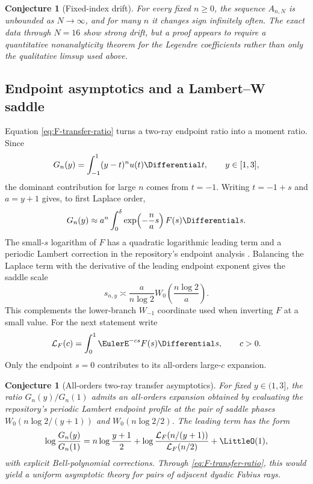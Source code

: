 \documentclass[11pt,oneside]{article}
\newtheorem{conjecture}[theorem]{Conjecture}
\theoremstyle{definition}
\theoremstyle{remark}
\begin{document}
\begin{conjecture}[Fixed-index drift]
\label{conj:fixed-index-drift}
For every fixed $n\ge0$, the sequence $A_{n,N}$ is unbounded as
$N\to\infty$, and for many $n$ it changes sign infinitely often.  The exact
data through $N=16$ show strong drift, but a proof appears to require a
quantitative nonanalyticity theorem for the Legendre coefficients rather
than only the qualitative limsup used above.
\end{conjecture}

\subsection{Endpoint asymptotics and a Lambert--W saddle}
Equation \eqref{eq:F-transfer-ratio} turns a two-ray endpoint ratio into a
moment ratio.  Since
\begin{equation}
 G_n(y)=\int_{-1}^{1}(y-t)^n u(t)\Differential t,
 \qquad y\in[1,3],
 \label{eq:G-integral}
\end{equation}
the dominant contribution for large $n$ comes from $t=-1$.  Writing
$t=-1+s$ and $a=y+1$ gives, to first Laplace order,
\begin{equation}
 G_n(y)\approx a^n\int_0^{\delta}
 \exp\!\left(-\frac{n}{a}s\right)F(s)\Differential s.
 \label{eq:G-Laplace-heuristic}
\end{equation}
The small-$s$ logarithm of $F$ has a quadratic logarithmic leading term and
a periodic Lambert correction in the repository's endpoint analysis
\cite{RepresentationFrontiers}.
Balancing the Laplace term with the derivative of the leading endpoint
exponent gives the saddle scale
\begin{equation}
 s_{n,y}\asymp
 \frac{a}{n\log2}
 W_0\!\left(\frac{n\log2}{a}\right).
 \label{eq:Lambert-saddle}
\end{equation}
This complements the lower-branch $W_{-1}$ coordinate used when inverting
$F$ at a small value.  For the next statement write
\begin{equation}
 \mathcal L_F(c)=\int_0^1 \EulerE^{-cs}F(s)\Differential s,
 \qquad c>0.
 \label{eq:local-Laplace-F}
\end{equation}
Only the endpoint $s=0$ contributes to its all-orders large-$c$ expansion.

\begin{conjecture}[All-orders two-ray transfer asymptotics]
\label{conj:two-ray-asymptotic}
For fixed $y\in(1,3]$, the ratio $G_n(y)/G_n(1)$ admits an all-orders
expansion obtained by evaluating the repository's periodic Lambert endpoint
profile at the pair of saddle phases
$W_0(n\log2/(y+1))$ and $W_0(n\log2/2)$.  The leading term has the form
\begin{equation}
 \log\frac{G_n(y)}{G_n(1)}
 =n\log\frac{y+1}{2}
 +\log\frac{\mathcal L_F(n/(y+1))}{\mathcal L_F(n/2)}
 +\LittleO(1),
 \label{eq:transfer-conjectural}
\end{equation}
with explicit Bell-polynomial corrections.  Through
\eqref{eq:F-transfer-ratio}, this would yield a uniform asymptotic theory for
pairs of adjacent dyadic Fabius rays.
\end{conjecture}
\end{document}
